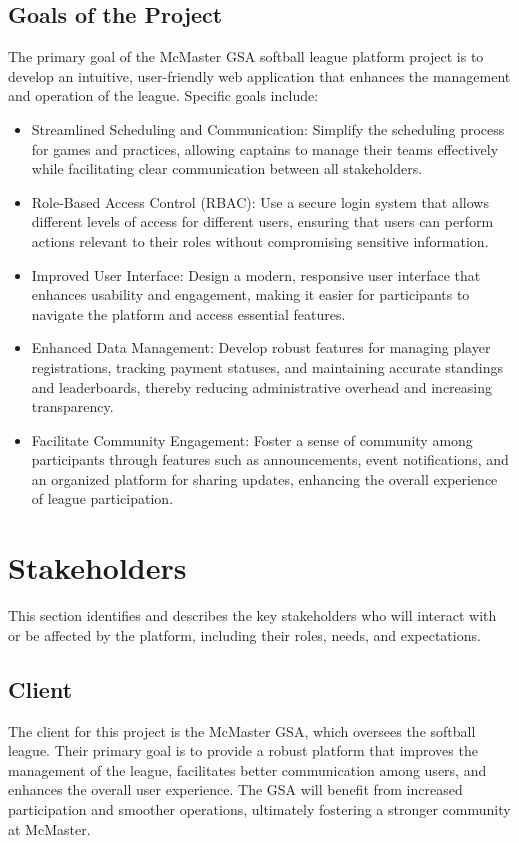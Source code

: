 \documentclass[12pt, titlepage]{article}
\begin{document}
\subsection{Goals of the Project}
The primary goal of the McMaster GSA softball league platform project is to develop an intuitive, user-friendly web application that enhances the management and operation of the league. Specific goals include:
\begin{itemize}
  \item Streamlined Scheduling and Communication: Simplify the scheduling process for games and practices, allowing captains to manage their teams effectively while facilitating clear communication between all stakeholders.
  \item Role-Based Access Control (RBAC): Use a secure login system that allows different levels of access for different users, ensuring that users can perform actions relevant to their roles without compromising sensitive information.
  \item Improved User Interface: Design a modern, responsive user interface that enhances usability and engagement, making it easier for participants to navigate the platform and access essential features.
  \item Enhanced Data Management: Develop robust features for managing player registrations, tracking payment statuses, and maintaining accurate standings and leaderboards, thereby reducing administrative overhead and increasing transparency.
  \item Facilitate Community Engagement: Foster a sense of community among participants through features such as announcements, event notifications, and an organized platform for sharing updates, enhancing the overall experience of league participation.
\end{itemize}

\pagebreak

\section{Stakeholders}
This section identifies and describes the key stakeholders who will interact with or be affected by the platform, including their roles, needs, and expectations.
\subsection{Client}
The client for this project is the McMaster GSA, which oversees the softball league. Their primary goal is to provide a robust platform that improves the management of the league, facilitates better communication among users, and enhances the overall user experience. The GSA will benefit from increased participation and smoother operations, ultimately fostering a stronger community at McMaster.
\end{document}
